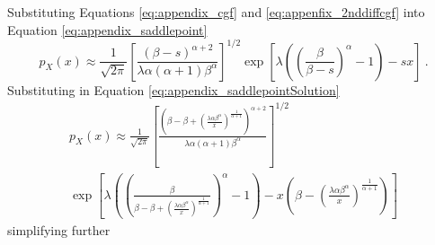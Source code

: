 Substituting Equations \eqref{eq:appendix_cgf} and \eqref{eq:appenfix_2nddiffcgf} into Equation \eqref{eq:appendix_saddlepoint}
\begin{equation*}
  p_X(x)\approx
  \frac{1}{\sqrt{2\pi}}
  \left[
    \frac{
      (\beta-s)^{\alpha+2}
    }
    {
      \lambda\alpha(\alpha+1)\beta^\alpha
    }
  \right]^{1/2}
  \exp\left[
    \lambda\left(\left(\frac{\beta}{\beta-s}\right)^\alpha-1\right)-sx
  \right]
  \ .
\end{equation*}
Substituting in Equation \eqref{eq:appendix_saddlepointSolution}
\begin{multline*}
  p_X(x)\approx
  \frac{1}{\sqrt{2\pi}}
  \left[
    \frac{\left(\beta-\beta+\left(\frac{\lambda\alpha\beta^\alpha}{x}\right)^{\frac{1}{\alpha+1}}\right)^{\alpha+2}}{\lambda\alpha(\alpha+1)\beta^\alpha}
  \right]^{1/2}
  \\
  \exp\left[
    \lambda
    \left(
      \left(
        \frac{\beta}{\beta-\beta+\left(\frac{\lambda\alpha\beta^\alpha}{x}\right)^{\frac{1}{\alpha+1}}}
      \right)^\alpha
      -1
    \right)
    -x\left(
      \beta-\left(\frac{\lambda\alpha\beta^\alpha}{x}\right)^{\frac{1}{\alpha+1}}
    \right)
  \right]
\end{multline*}
simplifying further
